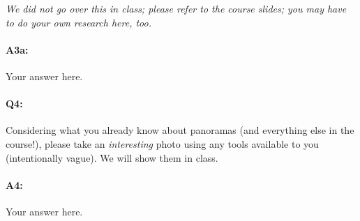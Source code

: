 \emph{We did not go over this in class; please refer to the course slides; you may have to do your own research here, too.}


\paragraph{A3a:} Your answer here.








\pagebreak
\paragraph{Q4:} 

Considering what you already know about panoramas (and everything else in the course!), please take an \emph{interesting} photo using any tools available to you (intentionally vague). We will show them in class.

\paragraph{A4:} Your answer here.









